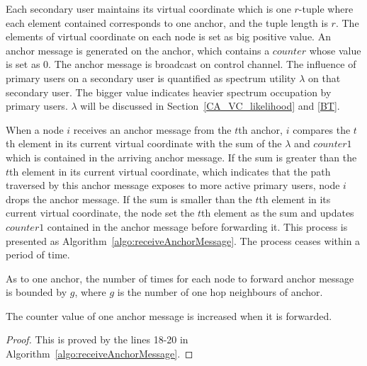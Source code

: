 Each secondary user maintains its virtual coordinate which is one $r$-tuple where each element contained corresponds to one anchor, and the tuple length is $r$.
The elements of virtual coordinate on each node is set as big positive value.
An anchor message is generated on the anchor, which contains a $counter$ whose value is set as 0.
The anchor message is broadcast on control channel.
The influence of primary users on a secondary user is quantified as spectrum utility $\lambda$ on that secondary user.
The bigger value indicates heavier spectrum occupation by primary users.
$\lambda$ will be discussed in Section~\ref{CA_VC_likelihood} and \ref{BT}.

When a node $i$ receives an anchor message from the $t$th anchor, $i$ compares the $t$th element in its current virtual coordinate with the sum of the $\lambda$ and $counter1$ which is contained in the arriving anchor message.
If the sum is greater than the $t$th element in its current virtual coordinate, which indicates that the path traversed by this anchor message exposes to more active primary users, node $i$ drops the anchor message.
If the sum is smaller than the $t$th element in its current virtual coordinate, the node set the $t$th element as the sum and updates $counter1$ contained in the anchor message before forwarding it.
This process is presented as Algorithm~\ref{algo:receiveAnchorMessage}.
The process ceases within a period of time.
\begin{lemma}
\label{savic:lemma1}
As to one anchor, the number of times for each node to forward anchor message is bounded by $g$, where $g$ is the number of one hop neighbours of anchor.
\end{lemma}

\begin{lemma}
\label{savic:lemma2}
The counter value of one anchor message is increased when it is forwarded.
\end{lemma}
\begin{proof}
This is proved by the lines 18-20 in Algorithm~\ref{algo:receiveAnchorMessage}.
\end{proof}

